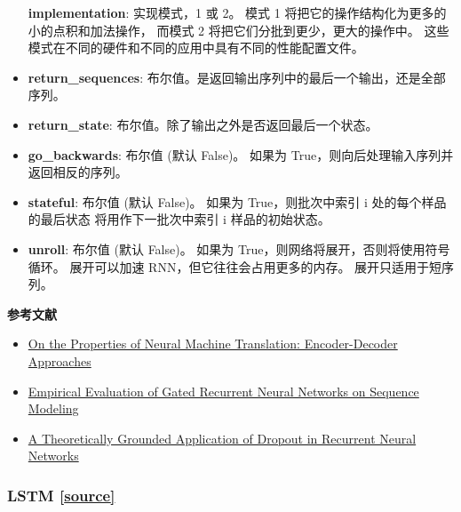 \begin{itemize}
  \textbf{implementation}: 实现模式，1 或 2。 模式 1
  将把它的操作结构化为更多的小的点积和加法操作， 而模式 2
  将把它们分批到更少，更大的操作中。
  这些模式在不同的硬件和不同的应用中具有不同的性能配置文件。
\item
  \textbf{return\_sequences}:
  布尔值。是返回输出序列中的最后一个输出，还是全部序列。
\item
  \textbf{return\_state}: 布尔值。除了输出之外是否返回最后一个状态。
\item
  \textbf{go\_backwards}: 布尔值 (默认 False)。 如果为
  True，则向后处理输入序列并返回相反的序列。
\item
  \textbf{stateful}: 布尔值 (默认 False)。 如果为 True，则批次中索引 i
  处的每个样品的最后状态 将用作下一批次中索引 i 样品的初始状态。
\item
  \textbf{unroll}: 布尔值 (默认 False)。 如果为
  True，则网络将展开，否则将使用符号循环。 展开可以加速
  RNN，但它往往会占用更多的内存。 展开只适用于短序列。
\end{itemize}

\textbf{参考文献}

\begin{itemize}
\tightlist
\item
  \href{https://arxiv.org/abs/1409.1259}{On the Properties of Neural
  Machine Translation: Encoder-Decoder Approaches}
\item
  \href{http://arxiv.org/abs/1412.3555v1}{Empirical Evaluation of Gated
  Recurrent Neural Networks on Sequence Modeling}
\item
  \href{http://arxiv.org/abs/1512.05287}{A Theoretically Grounded
  Application of Dropout in Recurrent Neural Networks}
\end{itemize}




\subsubsection{LSTM {\href{https://github.com/keras-team/keras/blob/master/keras/layers/recurrent.py\#L1881}{{[}source{]}}}}

